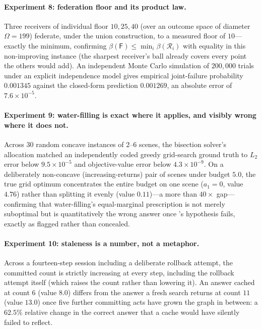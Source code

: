 \documentclass[11pt,twocolumn,a4paper]{article}
\theoremstyle{frathm}
\theoremstyle{definition}
\theoremstyle{remark}
\newcommand{\flo}{\beta}
\newcommand{\Rec}{\mathcal{R}}
\newcommand{\Fed}{\mathsf{F}}
\begin{document}
\paragraph{Experiment 8: federation floor and its product law.} Three
receivers of individual floor $10,25,40$ (over an outcome space of
diameter $\Omega=199$) federate, under the union construction, to a
measured floor of $10$---exactly the minimum, confirming
$\flo(\Fed)\le\min_i\flo(\Rec_i)$ with equality in this non-improving
instance (the sharpest receiver's ball already covers every point the
others would add). An independent Monte Carlo simulation of $200{,}000$
trials under an explicit independence model gives empirical joint-failure
probability $0.001345$ against the closed-form prediction $0.001269$, an
absolute error of $7.6\times10^{-5}$.

\paragraph{Experiment 9: water-filling is exact where it applies, and
visibly wrong where it does not.} Across $30$ random concave instances of
$2$--$6$ scenes, the bisection solver's allocation matched an
independently coded greedy grid-search ground truth to $L_2$ error below
$9.5\times10^{-5}$ and objective-value error below $4.3\times10^{-9}$. On
a deliberately non-concave (increasing-returns) pair of scenes under
budget $5.0$, the true grid optimum concentrates the entire budget on one
scene ($a_1{=}0$, value $4.76$) rather than splitting it evenly (value
$0.11$)---a more than $40\times$ gap---confirming that water-filling's
equal-marginal prescription is not merely suboptimal but is quantitatively
the wrong answer once 's hypothesis fails, exactly as
flagged rather than concealed.

\paragraph{Experiment 10: staleness is a number, not a metaphor.} Across
a fourteen-step session including a deliberate rollback attempt, the
committed count is strictly increasing at every step, including the
rollback attempt itself (which raises the count rather than lowering it).
An answer cached at count $6$ (value $8.0$) differs from the answer a
fresh search returns at count $11$ (value $13.0$) once five further
committing acts have grown the graph in between: a $62.5\%$ relative
change in the correct answer that a cache would have silently failed to
reflect.
\end{document}

